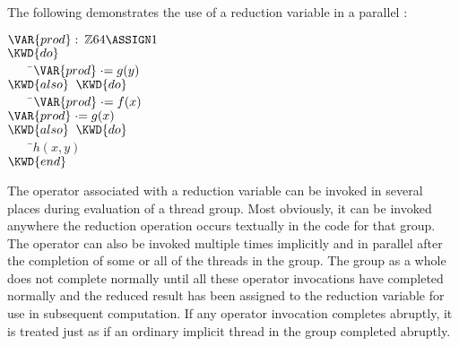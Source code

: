 The following demonstrates the use of a reduction variable 
in a parallel :
\begin{Fortress}
\(\VAR{prod} \mathrel{\mathtt{:}}\mskip 4mu plus 4mu\mathbb{Z}64 \ASSIGN 1\)\\
\(\KWD{do}\)\\
{\tt~~~~}\pushtabs\=\+\(    \VAR{prod} \mathrel{\cdot}= g(y)\)\-\\\poptabs
\(\KWD{also}\;\;\KWD{do}\)\\
{\tt~~~~}\pushtabs\=\+\(    \VAR{prod} \mathrel{\cdot}= f(x)\)\\
\(    \VAR{prod} \mathrel{\cdot}= g(x)\)\-\\\poptabs
\(\KWD{also}\;\;\KWD{do}\)\\
{\tt~~~~}\pushtabs\=\+\(    h(x,y)\)\-\\\poptabs
\(\KWD{end}\)
\end{Fortress}

The operator associated with a reduction variable can be invoked in
several places during evaluation of a thread group.  Most obviously,
it can be invoked anywhere the reduction operation occurs textually in
the code for that group.  The operator can also be invoked multiple
times implicitly and in parallel after the completion of some or all
of the threads in the group.  The group as a whole does not complete
normally until all these operator invocations have completed normally
and the reduced result has been assigned to the reduction variable for
use in subsequent computation.  If any operator invocation completes
abruptly, it is treated just as if an ordinary implicit thread in the
group completed abruptly.
